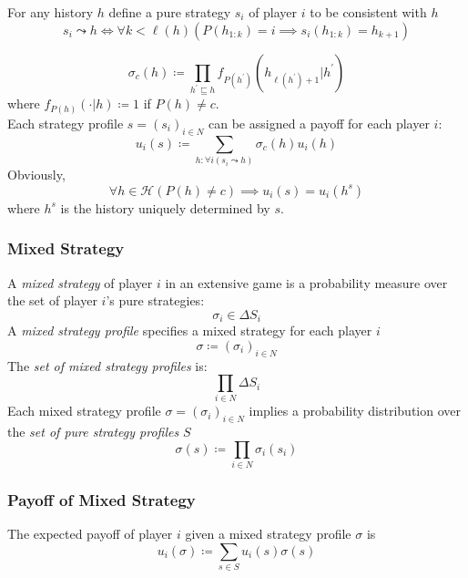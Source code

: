 \documentclass[UTF8,11pt,colorlinks,compress,openany]{beamer}%
\begin{document}
\begin{frame}\frametitle{}
\begin{definition}
	For any history $h$ define a pure strategy $s_i$ of player $i$ to be consistent with $h$
	\[s_i\leadsto h\iff\forall k<\ell(h)\left(P(h_{1:k})=i\implies s_i(h_{1:k})=h_{k+1}\right)\]
\end{definition}
\[\sigma_c(h)\coloneqq \prod\limits_{h^\prime\sqsubseteq h}f_{P(h^\prime)}(h_{\ell(h^\prime)+1}|h^\prime)\]
where $f_{P(h)}(\cdot|h)\coloneqq 1$ if $P(h)\neq c$.\\
Each strategy profile $s=(s_i)_{i\in N}$ can be assigned a payoff for each player $i$:
\[u_i(s)\coloneqq \sum\limits_{h: \forall i(s_i\leadsto h)}\sigma_c(h)u_i(h)\]
Obviously, \[\forall h\in\mathcal{H}\left(P(h)\neq c\right)\implies u_i(s)=u_i(h^s)\] where $h^s$ is the history uniquely determined by $s$.
\end{frame}

\begin{frame}\frametitle{Mixed Strategy}
\setlength\abovedisplayskip{0pt}
\begin{definition}
	A \emph{mixed strategy} of player $i$ in an extensive game is a probability measure over the set of player $i$'s pure strategies:
	\[\sigma_i\in\Delta S_i\]
	A \emph{mixed strategy profile} specifies a mixed strategy for each	player $i$
	\[\sigma\coloneqq (\sigma_i)_{i\in N}\]
	The \emph{set of mixed strategy profiles} is:
	\[\prod\limits_{i\in N}\Delta S_i\]
	Each mixed strategy profile $\sigma=(\sigma_i)_{i\in N}$ implies a probability distribution
	over the \emph{set of pure strategy profiles} $S$
	\[\sigma(s)\coloneqq \prod\limits_{i\in N} \sigma_i(s_i)\]
\end{definition}
\end{frame}

\begin{frame}\frametitle{Payoff of Mixed Strategy}
\begin{definition}
	The expected payoff of player $i$ given a mixed strategy profile $\sigma$ is
	\[u_i(\sigma)\coloneqq \sum\limits_{s\in S}u_i(s)\sigma(s)\]
\end{definition}
\end{frame}
\end{document}
